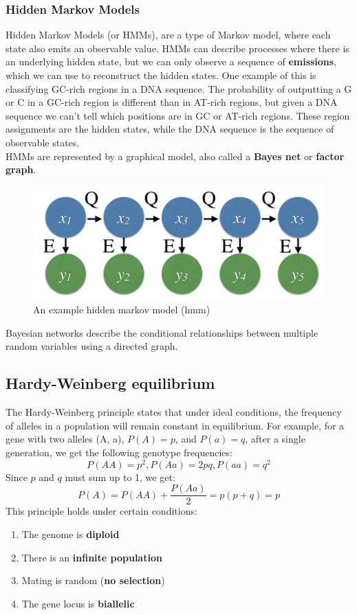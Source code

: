 \documentclass[12pt]{article}
\begin{document}
\subsubsection{Hidden Markov Models}
Hidden Markov Models (or HMMs), are a type of Markov model, where each state also emits an observable value. HMMs can describe processes where there is an underlying hidden state, but we can only observe a sequence of \textbf{emissions}, which we can use to reconstruct the hidden states. One example of this is classifying GC-rich regions in a DNA sequence. The probability of outputting a G or C in a GC-rich region is different than in AT-rich regions, but given a DNA sequence we can't tell which positions are in GC or AT-rich regions. These region assignments are the hidden states, while the DNA sequence is the sequence of observable states.\\[10pt]
HMMs are represented by a graphical model, also called a \textbf{Bayes net} or \textbf{factor graph}.
\begin{figure}
    \centering
    \includegraphics[width = .7\linewidth]{hmm.png}
    \caption{An example hidden markov model (hmm)}
    \label{fig:hmm}
\end{figure}
Bayesian networks describe the conditional relationships between multiple random variables using a directed graph.

\subsection{Hardy-Weinberg equilibrium}
The Hardy-Weinberg principle states that under ideal conditions, the frequency of alleles in a population will remain constant in equilibrium. For example, for a gene with two alleles (A, a), $P(A) = p$, and $P(a) = q$, after a single generation, we get the following genotype frequencies:
$$P(AA) = p^2, P(Aa) = 2pq, P(aa) = q^2$$
Since $p$ and $q$ must sum up to 1, we get:
$$P(A) = P(AA) + \frac{P(Aa)}{2} = p(p+q) = p$$
This principle holds under certain conditions:
\begin{enumerate}
    \item The genome is \textbf{diploid}
    \item There is an \textbf{infinite population}
    \item Mating is random (\textbf{no selection})
    \item The gene locus is \textbf{biallelic}
\end{enumerate}
\end{document}
